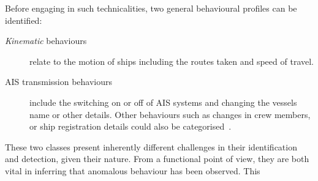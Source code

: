 \iffalse
The current research will maintain a similar structure throughout, dividing each chapter into two
parts; each addressing their assigned research question. Following the Introduction, Chapter 2 will
present the Literature Review, which will discuss and relate previous studies to the current research.
Chapter 3 presents the Method, which addresses the necessary methodology required per part. Part 1
can be considered an exploratory analysis of Bejarano’s (2016) work and of the data itself, whereas
part 2 briefly explains the new target feature and subset required to detect fishing gear types.
Naturally, the experiments will be explained in this chapter prior to conducting them. Chapter 4
presents the results obtained per experiment. Chapter 5 presents the Discussion, where the
classification results will be analyzed in further detail along with the contributions, limitations, and recommendations for future research.

The remainder of this work is organized as follows: Section 2 reviews the background
and related work regarding the open data, AD and data fusion in the MS domain. Section 3
presents the research methodology. Validity threats and verification are described in sections
4 and 5, respectively. Section 6 presents the experiment results and the validation results are
shown in section 7. Section 8 features a detailed discussion about the obtained results.
Finally, section 9 concludes the research with a discussion on the possible directions for
future work.
\fi

\iffalse
Before engaging in such technicalities, two general behavioural profiles can be identified:
\begin{description}
\item[\emph{Kinematic} behaviours] relate to the motion of ships including the routes taken and speed of travel.
\item [AIS transmission behaviours] include the switching on or off of AIS systems and changing the vessels name or other details. Other behaviours such as changes in crew members, or ship registration details could also be categorised~\cite{Lane2010}.
\end{description}


These two classes present inherently different challenges in their identification and detection, given their nature. From a functional point of view, they are both vital in inferring that anomalous behaviour has been observed. This 

